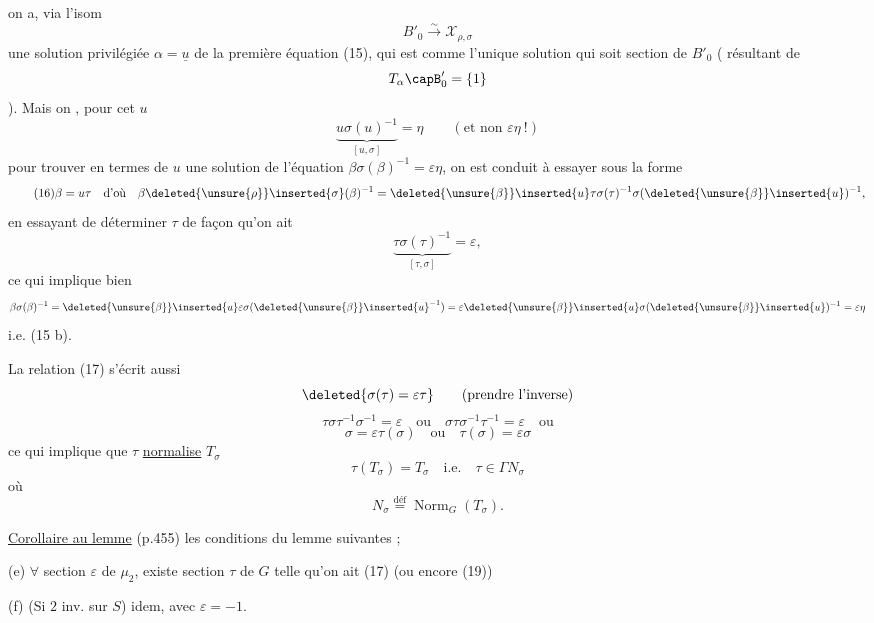  on a, via l'isom
\[
B'_0\xrightarrow{\sim}\mathcal X_{\rho,\sigma}
\]
une solution privilégiée $\alpha=\underline u$ de la première équation (15), qui est
 comme l'unique solution qui soit  section de
$B'_0$ ( résultant de
\[
T_\alpha\capB'_0=\{1\}
\]
).
Mais on , pour cet $u$
\[
\underbrace{u\sigma(u)^{-1}}_{[u,\sigma]}=\eta
\qquad(\text{et non }\varepsilon\eta\ !)
\]
pour trouver en termes de $u$ une solution de l'équation
 $\beta\sigma(\beta)^{-1}=\varepsilon\eta$, on est conduit à essayer sous la forme
\[
\tag{16}
\beta=u\tau\quad\text{d'où}\quad
\beta\deleted{\unsure{\rho}}\inserted{\sigma}(\beta)^{-1}
=\deleted{\unsure{\beta}}\inserted{u}\tau\sigma(\tau)^{-1}
\sigma(\deleted{\unsure{\beta}}\inserted{u})^{-1},
\]
en essayant de déterminer $\tau$ de façon qu'on ait
\[
\tag{17}
\underbrace{\tau\sigma(\tau)^{-1}}_{[\tau,\sigma]}=\varepsilon,
\]
ce qui implique bien
\[
\beta\sigma(\beta)^{-1}
=\deleted{\unsure{\beta}}\inserted{u}\varepsilon\sigma(\deleted{\unsure{\beta}}\inserted{u}^{-1})
=\varepsilon\deleted{\unsure{\beta}}\inserted{u}\sigma(\deleted{\unsure{\beta}}\inserted{u})^{-1}
=\varepsilon\eta
\]
i.e. (15 b). 

La relation (17) s'écrit aussi
\[
\deleted{\sigma(\tau)=\varepsilon\tau}
\qquad(\text{prendre l'inverse})
\]
\[
\tag{18}
\tau\sigma\tau^{-1}\sigma^{-1}=\varepsilon
\quad\text{ou}\quad
\sigma\tau\sigma^{-1}\tau^{-1}=\varepsilon
\quad\text{ou}
\]
\[
\tag{19}
\sigma=\varepsilon\tau(\sigma)
\quad\text{ou}\quad
\tau(\sigma)=\varepsilon\sigma
\]
ce qui implique que $\tau$ \uline{normalise} $T_\sigma$
\[
\tag{20}
\tau(T_\sigma)=T_\sigma\quad\text{i.e.}\quad\tau\in\Gamma N_\sigma
\]
où
\[
\tag{21}
N_\sigma\overset{\text{déf}}{=}\operatorname{Norm}_G(T_\sigma).
\]

\uline{Corollaire au lemme} (p.455) les conditions  du lemme
 
  suivantes ;

(e) $\forall$ section 
$\varepsilon$ de $\mu_2$, existe 
section  $\tau$ de $G$ telle qu'on ait (17) (ou encore (19))

(f) (Si $2$ inv. sur $S$) idem, avec $\varepsilon=-1$.

